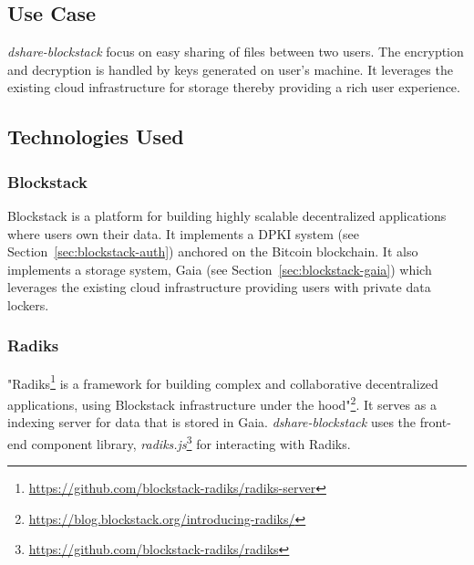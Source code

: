 		\subsection{Use Case}
		\textit{dshare-blockstack} focus on easy sharing of files between two users. The encryption and decryption is handled by keys generated on user's machine. It leverages the existing cloud infrastructure for storage thereby providing a rich user experience.
		
		\subsection{Technologies Used}
			\subsubsection{Blockstack}
			Blockstack\cite{ali2016blockstack} is a platform for building highly scalable decentralized applications where users own their data. It implements a DPKI system (see Section~\ref{sec:blockstack-auth}) anchored on the Bitcoin blockchain. It also implements a storage system, Gaia (see Section~\ref{sec:blockstack-gaia}) which leverages the existing cloud infrastructure providing users with private data lockers.
			
			\subsubsection{Radiks}
			"Radiks\footnote{\url{https://github.com/blockstack-radiks/radiks-server}} is a framework for building complex and collaborative decentralized applications, using Blockstack infrastructure under the hood"\footnote{\url{https://blog.blockstack.org/introducing-radiks/}}. It serves as a indexing server for data that is stored in Gaia. \textit{dshare-blockstack} uses the front-end component library, \textit{radiks.js}\footnote{\url{https://github.com/blockstack-radiks/radiks}} for interacting with Radiks.
		
